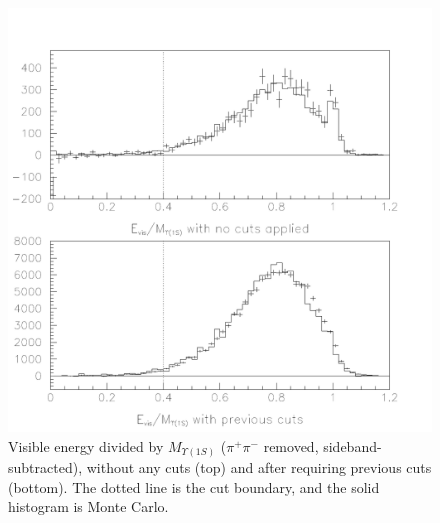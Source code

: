 \begin{figure}[p]
  \includegraphics[width=\linewidth]{plots/cascades_visen}
  \caption{\label{cascades_visen} Visible energy divided by
  $M_{\Upsilon(1S)}$ ($\pi^+\pi^-$ removed, sideband-subtracted),
  without any cuts (top) and after requiring previous cuts (bottom).
  The dotted line is the cut boundary, and the solid histogram is
  Monte Carlo.}
\end{figure}

